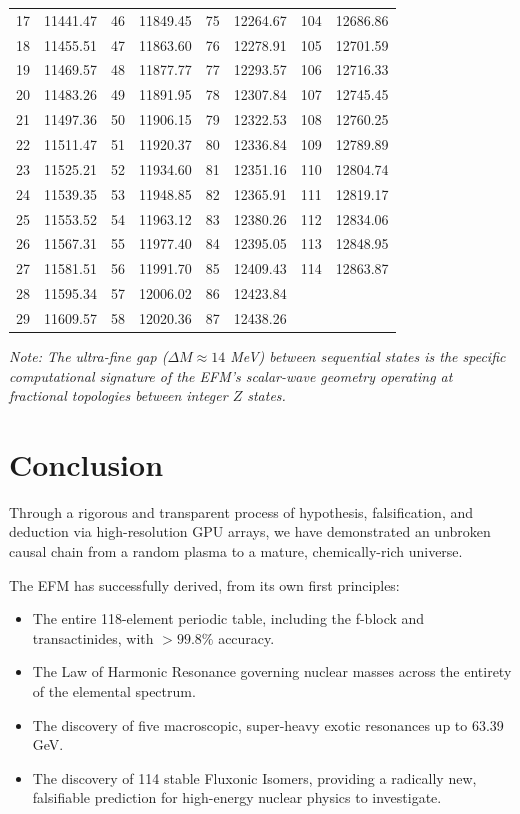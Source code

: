 \documentclass[11pt, twoside]{article}
\begin{document}
\begin{table}[H]
{\begin{tabular}{@{}lc|lc|lc|lc@{}}
17 & 11441.47 & 46 & 11849.45 & 75 & 12264.67 & 104 & 12686.86 \\
18 & 11455.51 & 47 & 11863.60 & 76 & 12278.91 & 105 & 12701.59 \\
19 & 11469.57 & 48 & 11877.77 & 77 & 12293.57 & 106 & 12716.33 \\
20 & 11483.26 & 49 & 11891.95 & 78 & 12307.84 & 107 & 12745.45 \\
21 & 11497.36 & 50 & 11906.15 & 79 & 12322.53 & 108 & 12760.25 \\
22 & 11511.47 & 51 & 11920.37 & 80 & 12336.84 & 109 & 12789.89 \\
23 & 11525.21 & 52 & 11934.60 & 81 & 12351.16 & 110 & 12804.74 \\
24 & 11539.35 & 53 & 11948.85 & 82 & 12365.91 & 111 & 12819.17 \\
25 & 11553.52 & 54 & 11963.12 & 83 & 12380.26 & 112 & 12834.06 \\
26 & 11567.31 & 55 & 11977.40 & 84 & 12395.05 & 113 & 12848.95 \\
27 & 11581.51 & 56 & 11991.70 & 85 & 12409.43 & 114 & 12863.87 \\
28 & 11595.34 & 57 & 12006.02 & 86 & 12423.84 & & \\
29 & 11609.57 & 58 & 12020.36 & 87 & 12438.26 & & \\ \bottomrule
\end{tabular}
}
\vspace{0.2cm}
\small{\textit{Note: The ultra-fine gap ($\Delta M \approx 14$ MeV) between sequential states is the specific computational signature of the EFM's scalar-wave geometry operating at fractional topologies between integer $Z$ states.}}
\end{table}

\section{Conclusion}

Through a rigorous and transparent process of hypothesis, falsification, and deduction via high-resolution GPU arrays, we have demonstrated an unbroken causal chain from a random plasma to a mature, chemically-rich universe. 

The EFM has successfully derived, from its own first principles:
\begin{itemize}
    \item The entire 118-element periodic table, including the f-block and transactinides, with $>99.8\%$ accuracy.
    \item The Law of Harmonic Resonance governing nuclear masses across the entirety of the elemental spectrum.
    \item The discovery of five macroscopic, super-heavy exotic resonances up to 63.39 GeV.
    \item The discovery of 114 stable Fluxonic Isomers, providing a radically new, falsifiable prediction for high-energy nuclear physics to investigate.
\end{itemize}
\end{document}
